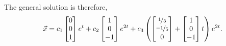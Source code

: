 \documentclass{ximera}
\begin{document}
\begin{exampleSol}
    The general solution is therefore,
    \begin{equation*}
        \vec{x} = c_1
        \begin{bmatrix} 
            0 \\ 
            0 \\ 
            1 
        \end{bmatrix}
        e^t + c_2 
        \begin{bmatrix} 
            1 \\ 
            0 \\ 
            -1 
        \end{bmatrix}
        e^{2t} + c_3 \left(
        \begin{bmatrix} 
            \nicefrac{1}{5} \\ 
            \nicefrac{-1}{5} \\ 
            0 
        \end{bmatrix}
        +
        \begin{bmatrix} 
            1 \\ 
            0 \\ 
            -1 
        \end{bmatrix}
        t \right)e^{2t} .
    \end{equation*}
\end{exampleSol}
\end{document}
